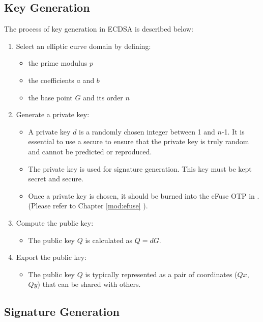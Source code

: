 \documentclass[main\_\_EN.tex]{subfiles}
\begin{document}
\subsection{Key Generation}

The process of key generation in ECDSA is described below:
\begin{enumerate}
    \item Select an elliptic curve domain by defining:
    \begin{itemize}
        \item the prime modulus $p$
        \item the coefficients $a$ and $b$
        \item the base point $G$ and its order $n$
    \end{itemize}
    \item Generate a private key:
    \begin{itemize}
        \item A private key $d$ is a randomly chosen integer between 1 and $n$-1. It is essential to use a secure \textit{} to ensure that the private key is truly random and cannot be predicted or reproduced.
        \item The private key is used for signature generation. This key must be kept secret and secure.
        \item Once a private key is chosen, it should be burned into the eFuse OTP in \chipname{}. (Please refer to Chapter \ref{mod:efuse} \textit{}).
    \end{itemize}
    \item Compute the public key:
    \begin{itemize}
        \item The public key $Q$ is calculated as $Q = dG$.
    \end{itemize}
    \item Export the public key:
    \begin{itemize}
        \item The public key $Q$ is typically represented as a pair of coordinates ($Qx$, $Qy$) that can be shared with others.
    \end{itemize}
\end{enumerate}

\subsection{Signature Generation}
\end{document}
